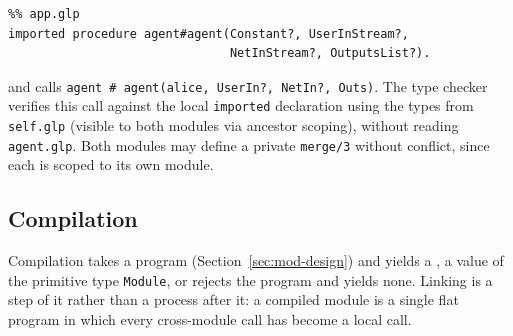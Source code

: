 \begin{verbatim}
%% app.glp
imported procedure agent#agent(Constant?, UserInStream?,
                               NetInStream?, OutputsList?).
\end{verbatim}

and calls \verb|agent # agent(alice, UserIn?, NetIn?, Outs)|.  The type checker verifies this call against the local \verb|imported| declaration using the types from \verb|self.glp| (visible to both modules via ancestor scoping), without reading \verb|agent.glp|.  Both modules may define a private \verb|merge/3| without conflict, since each is scoped to its own module.

\subsection{Compilation}
\label{sec:compilation}

Compilation takes a program (Section~\ref{sec:mod-design}) and yields a , a value of the primitive type \verb|Module|, or rejects the program and yields none.  Linking is a step of it rather than a process after it: a compiled module is a single flat program in which every cross-module call has become a local call.

